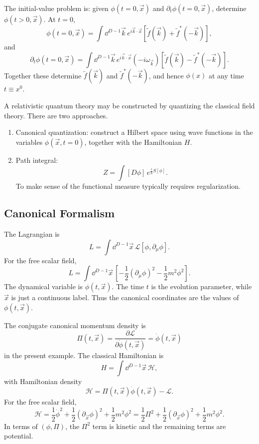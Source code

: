 The initial-value problem is: given
\(\phi(t=0,\vec x)\) and \(\partial_t\phi(t=0,\vec x)\), determine
\(\phi(t>0,\vec x)\). At \(t=0\),
\[
  \phi(t=0,\vec x)
  =
  \int\dd^{D-1}\vec k\,e^{i\vec k\cdot\vec x}
  \left[
    \widetilde f(\vec k)+\widetilde f^*(-\vec k)
  \right],
\]
and
\[
  \partial_t\phi(t=0,\vec x)
  =
  \int\dd^{D-1}\vec k\,e^{i\vec k\cdot\vec x}
  (-i\omega_{\vec k})
  \left[
    \widetilde f(\vec k)-\widetilde f^*(-\vec k)
  \right].
\]
Together these determine \(\widetilde f(\vec k)\) and
\(\widetilde f^*(-\vec k)\), and hence \(\phi(x)\) at any time
\(t\equiv x^0\).

A relativistic quantum theory may be constructed by quantizing the classical
field theory. There are two approaches.

\begin{enumerate}[label=(\arabic*)]
\item Canonical quantization: construct a Hilbert space using wave functions
  in the variables \(\phi(\vec x,t=0)\), together with the Hamiltonian \(H\).
\item Path integral:
  \[
    Z=\int[D\phi]\,
    e^{\frac{i}{\hbar}S[\phi]} .
  \]
  To make sense of the functional measure typically requires regularization.
\end{enumerate}

\subsection{Canonical Formalism}

The Lagrangian is
\[
  L=\int\dd^{D-1}\vec x\,
  \mathcal L[\phi,\partial_\mu\phi].
\]
For the free scalar field,
\[
  L=\int\dd^{D-1}\vec x\,
  \left[
    -\frac12(\partial_\mu\phi)^2-\frac12m^2\phi^2
  \right].
\]
The dynamical variable is \(\phi(t,\vec x)\). The time \(t\) is the evolution
parameter, while \(\vec x\) is just a continuous label. Thus the canonical
coordinates are the values of \(\phi(t,\vec x)\).

The conjugate canonical momentum density is
\[
  \Pi(t,\vec x)
  =
  \frac{\partial\mathcal L}{\partial\dot\phi(t,\vec x)}
  =
  \dot\phi(t,\vec x)
\]
in the present example. The classical Hamiltonian is
\[
  H=\int\dd^{D-1}\vec x\,\mathcal H,
\]
with Hamiltonian density
\[
  \mathcal H
  =
  \Pi(t,\vec x)\dot\phi(t,\vec x)-\mathcal L.
\]
For the free scalar field,
\[
  \mathcal H
  =
  \frac12\dot\phi^2+\frac12(\partial_{\vec x}\phi)^2+\frac12m^2\phi^2
  =
  \frac12\Pi^2+\frac12(\partial_{\vec x}\phi)^2+\frac12m^2\phi^2.
\]
In terms of \((\phi,\Pi)\), the \(\Pi^2\) term is kinetic and the remaining
terms are potential.

